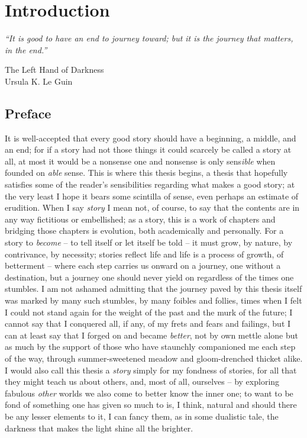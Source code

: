 \chapter{Introduction}\label{ch:intro}
\epigraph{
    \emph{
        ``It is good to have an end to journey toward; but it is the journey that matters, in the
        end.''
} 
%
}
{The Left Hand of Darkness\\Ursula K. Le Guin}
%
\section*{Preface}
%
\noindent 
%
It is well-accepted that every good story should have a beginning, a middle, and an end; for if a
story had not those things it could scarcely be called a story at all, at most it would be a
nonsense one and nonsense is only sens\emph{ible} when founded on \emph{able} sense.
%
This is where this thesis begins, a thesis that hopefully satisfies some of the reader's
sensibilities regarding what makes a good story; at the very least I hope it bears some scintilla
of sense, even perhaps an estimate of erudition.
%
%
When I say \emph{story} I mean not, of course, to say that the contents are in any way fictitious
or embellished; as a story, this is a work of chapters and bridging those chapters is evolution,
both academically and personally.
%
For a story to \emph{become} -- to tell itself or let itself be told -- it must grow, by nature, by
contrivance, by necessity; stories reflect life and life is a process of growth, of betterment --
where each step carries us onward on a journey, one without a destination, but a journey one should
never yield on regardless of the times one stumbles. 
%
I am not ashamed admitting that the journey paved by this thesis itself was marked by many such
stumbles, by many foibles and follies, times when I felt I could not stand again for the weight of
the past and the murk of the future; I cannot say that I conquered all, if any, of my frets and
fears and failings, but I can at least say that I forged on and became \emph{better}, not by own
mettle alone but as much by the support of those who have staunchly companioned me each step of the
way, through summer-sweetened meadow and gloom-drenched thicket alike.
%
I would also call this thesis a \emph{story} simply for my fondness of stories, for all that they
might teach us about others, and, most of all, ourselves -- by exploring fabulous \emph{other}
worlds we also come to better know the inner one; to want to be fond of something one has given so
much to is, I think, natural and should there be any lesser elements to it, I can fancy them, as in
some dualistic tale, the darkness that makes the light shine all the brighter. 
%
%
